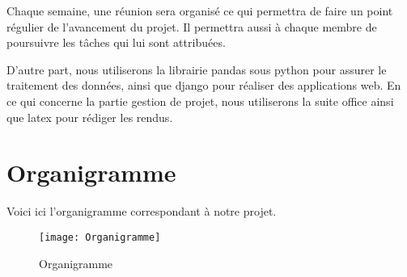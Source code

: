 Chaque semaine, une réunion sera organisé ce qui permettra de faire un point régulier de l'avancement du projet. Il permettra aussi à chaque membre de poursuivre les tâches qui lui sont attribuées.

D'autre part, nous utiliserons la librairie pandas sous python pour assurer le traitement des données, ainsi que django pour réaliser des applications web. En ce qui concerne la partie gestion de projet, nous utiliserons la suite office ainsi que latex pour rédiger les rendus.

\section*{Organigramme}
Voici ici l'organigramme correspondant à notre projet.
\begin{figure}[!ht]
	\centering
	\texttt{[image: Organigramme]}
	\caption{Organigramme}
	\label{fig:Organigramme}
\end{figure}



